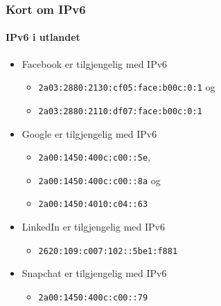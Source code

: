 \begin{frame}%
  \frametitle{Kort om IPv6}
  \framesubtitle{IPv6 i utlandet}
  \pause
  \begin{itemize}[<+->]
  \item Facebook er tilgjengelig med IPv6
    \begin{itemize}[<+->]
    \item \texttt{2a03:2880:2130:cf05:face:b00c:0:1} og
    \item \texttt{2a03:2880:2110:df07:face:b00c:0:1}
    \end{itemize}
  \item Google er tilgjengelig med IPv6
    \begin{itemize}[<+->]
    \item \texttt{2a00:1450:400c:c00::5e},
    \item \texttt{2a00:1450:400c:c00::8a} og
    \item \texttt{2a00:1450:4010:c04::63}
    \end{itemize}
  \item LinkedIn er tilgjengelig med IPv6
    \begin{itemize}[<+->]
    \item \texttt{2620:109:c007:102::5be1:f881}
    \end{itemize}
  \item Snapchat er tilgjengelig med IPv6
    \begin{itemize}[<+->]
    \item \texttt{2a00:1450:400c:c00::79}
    \end{itemize}
  \end{itemize}
\end{frame}

